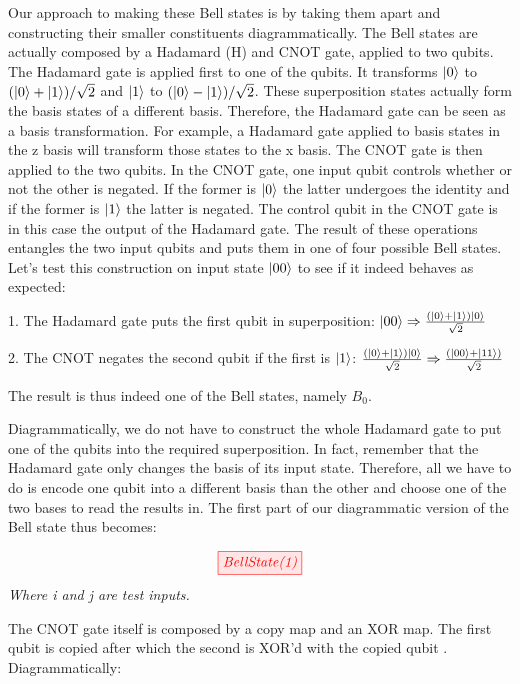 \documentclass[]{article}
\begin{document}
Our approach to making these Bell states is by taking them apart and constructing their smaller constituents diagrammatically. The Bell states are actually composed by a Hadamard (H) and CNOT gate, applied to two qubits. The Hadamard gate is applied first to one of the qubits. It transforms $\ket{0}$ to  $(\ket{0} + \ket{1})/\sqrt{2}$ and $\ket{1}$ to $(\ket{0} - \ket{1})/\sqrt{2}$. These superposition states actually form the basis states of a different basis. Therefore, the Hadamard gate can be seen as a basis transformation. For example, a Hadamard gate applied to basis states in the z basis will transform those states to the x basis. The CNOT gate is then applied to the two qubits. In the CNOT gate, one input qubit controls whether or not the other is negated. If the former is $\ket{0}$ the latter undergoes the identity and if the former is $\ket{1}$ the latter is negated. The control qubit in the CNOT gate is in this case the output of the Hadamard gate. The result of these operations entangles the two input qubits and puts them in one of four possible Bell states. Let's test this construction on input state $\ket{00}$ to see if it indeed behaves as expected:

1. The Hadamard gate puts the first qubit in superposition: $\ket{00} \Rightarrow \frac{(\ket{0} + \ket{1})\ket{0}}{\sqrt{2}}$

2. The CNOT negates the second qubit if the first is $\ket{1}$: $\frac{(\ket{0} + \ket{1})\ket{0}}{\sqrt{2}} \Rightarrow \frac{(\ket{00} + \ket{11})}{\sqrt{2}}$

The result is thus indeed one of the Bell states, namely $B_0$.

Diagrammatically, we do not have to construct the whole Hadamard gate to put one of the qubits into the required superposition. In fact, remember that the Hadamard gate only changes the basis of its input state. Therefore, all we have to do is encode one qubit into a different basis than the other and choose one of the two bases to read the results in. The first part of our diagrammatic version of the Bell state thus becomes:

\begin{equation}
	\label{equation:BellState(1)}
	\tikzfig{BellState(1)}
\end{equation}
\textit{Where i and j are test inputs.}

The CNOT gate itself is composed by a copy map and an XOR map. The first qubit is copied after which the second is XOR'd with the copied qubit \cite{articleCNOT}. Diagrammatically:
\end{document}
